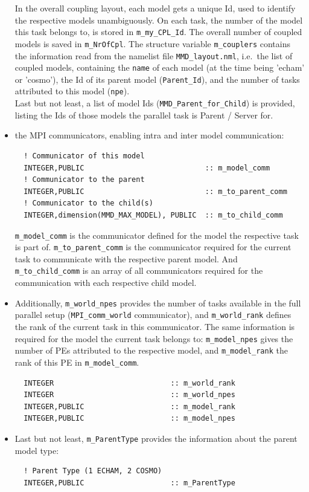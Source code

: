 \documentclass[twoside]{article}
\begin{document}
\begin{itemize}
\begin{verbatim}
\end{verbatim}
  In the overall coupling layout, each model gets a unique Id, used to
  identify the  respective models unambiguously. On each task, the
  number of the model this task belongs to, is stored
  in \verb|m_my_CPL_Id|. The overall number of coupled models is saved
  in \verb|m_NrOfCpl|. The structure variable \verb|m_couplers|
  contains the information read from the namelist
  file \verb|MMD_layout.nml|, i.e.\ the list of coupled models,
  containing the \verb|name| of each model (at the time being 'echam' or
  'cosmo'), the Id of its parent model (\verb|Parent_Id|), and the
  number of tasks attributed to this model (\verb|npe|).\\
  Last but not least, a list of model Ids (\verb|MMD_Parent_for_Child|) is
  provided, listing the Ids of those models the parallel task is
  Parent / Server for.
\item the MPI communicators, enabling intra and inter model communication:
\begin{verbatim}
  ! Communicator of this model
  INTEGER,PUBLIC                            :: m_model_comm         
  ! Communicator to the parent
  INTEGER,PUBLIC                            :: m_to_parent_comm      
  ! Communicator to the child(s)
  INTEGER,dimension(MMD_MAX_MODEL), PUBLIC  :: m_to_child_comm      
\end{verbatim}
\verb|m_model_comm| is the communicator defined for the model the
  respective task is part of. \verb|m_to_parent_comm| is the
  communicator required for the current task to communicate with the
  respective parent model. And \verb|m_to_child_comm| is an array of
  all communicators required for the communication with each
  respective child model.
\item Additionally,  \verb|m_world_npes| provides the number of tasks
  available in the full parallel setup (\verb|MPI_comm_world|
  communicator), and \verb|m_world_rank| defines the 
  rank of the current task in this communicator. The same information
  is required for the model the current task belongs
  to: \verb|m_model_npes| gives the number of PEs attributed to the
  respective model, and \verb|m_model_rank| the rank of this PE
  in \verb|m_model_comm|. 
\begin{verbatim}
  INTEGER                           :: m_world_rank
  INTEGER                           :: m_world_npes
  INTEGER,PUBLIC                    :: m_model_rank
  INTEGER,PUBLIC                    :: m_model_npes
\end{verbatim}
\item Last but not least, \verb|m_ParentType| provides the
  information about the parent model type:
\begin{verbatim}
  ! Parent Type (1 ECHAM, 2 COSMO)
  INTEGER,PUBLIC                    :: m_ParentType          
\end{verbatim}
\end{itemize}
\end{document}

